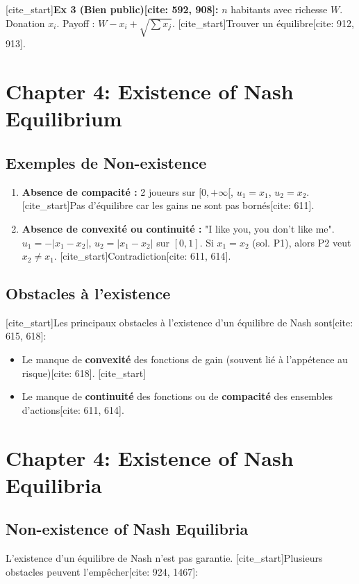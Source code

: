 [cite_start]\textbf{Ex 3 (Bien public)[cite: 592, 908]:} $n$ habitants avec richesse $W$. Donation $x_i$. Payoff : $W - x_i + \sqrt{\sum x_j}$. [cite_start]Trouver un équilibre[cite: 912, 913].


\newpage
\section{Chapter 4: Existence of Nash Equilibrium}

\subsection{Exemples de Non-existence}

\begin{enumerate}
    \item \textbf{Absence de compacité :} 2 joueurs sur $[0, +\infty[$, $u_1 = x_1$, $u_2 = x_2$. [cite_start]Pas d'équilibre car les gains ne sont pas bornés[cite: 611].
    \item \textbf{Absence de convexité ou continuité :} "I like you, you don't like me". $u_1 = -|x_1 - x_2|$, $u_2 = |x_1 - x_2|$ sur $[0,1]$. Si $x_1=x_2$ (sol. P1), alors P2 veut $x_2 \ne x_1$. [cite_start]Contradiction[cite: 611, 614].
\end{enumerate}

\subsection{Obstacles à l'existence}
[cite_start]Les principaux obstacles à l'existence d'un équilibre de Nash sont[cite: 615, 618]:
\begin{itemize}
    [cite_start]\item Le manque de \textbf{convexité} des fonctions de gain (souvent lié à l'appétence au risque)[cite: 618].
    [cite_start]\item Le manque de \textbf{continuité} des fonctions ou de \textbf{compacité} des ensembles d'actions[cite: 611, 614].
\end{itemize}


\section{Chapter 4: Existence of Nash Equilibria}

\subsection{Non-existence of Nash Equilibria}
L'existence d'un équilibre de Nash n'est pas garantie. [cite_start]Plusieurs obstacles peuvent l'empêcher[cite: 924, 1467]:

